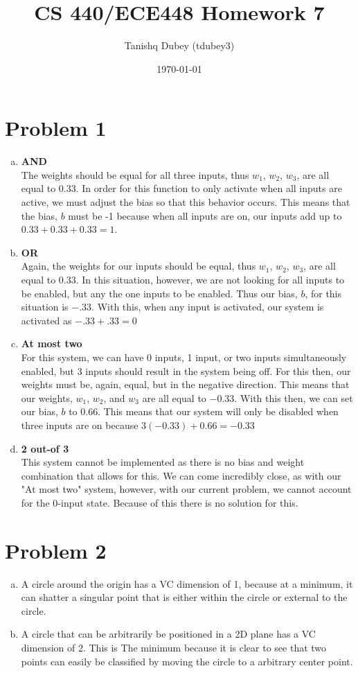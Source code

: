\documentclass[12pt]{article}%
\begin{document}
\title{CS 440/ECE448 Homework 7}
\author{Tanishq Dubey (tdubey3)}
\date{\today}
\maketitle
\section*{Problem 1}
    \begin{enumerate}[a)]
        \item \textbf{AND} \\
        The weights should be equal for all three inputs, thus $w_1$, $w_2$, $w_3$, are all equal to $0.33$. In order for this function to only activate when all inputs are active, we must adjust the bias so that this behavior occurs. This means that the bias, $b$ must be -1 because when all inputs are on, our inputs add up to $0.33 + 0.33 + 0.33 = 1$.
        \item \textbf{OR} \\
        Again, the weights for our inputs should be equal, thus $w_1$, $w_2$, $w_3$, are all equal to $0.33$. In this situation, however, we are not looking for all inputs to be enabled, but any the one inputs to be enabled. Thus our bias, $b$, for this situation is $-.33$. With this, when any input is activated, our system is activated as $-.33 + .33 = 0$
        \item \textbf{At most two} \\
        For this system, we can have 0 inputs, 1 input, or two inputs simultaneously enabled, but 3 inputs should result in the system being off. For this then, our weights must be, again, equal, but in the negative direction. This means that our weights, $w_1$, $w_2$, and $w_3$ are all equal to $-0.33$. With this then, we can set our bias, $b$ to $0.66$. This means that our system will only be disabled when three inputs are on because $3(-0.33) + 0.66 = -0.33$
        \item \textbf{2 out-of 3} \\
        This system cannot be implemented as there is no bias and weight combination that allows for this. We can come incredibly close, as with our "At most two" system, however, with our current problem, we cannot account for the 0-input state. Because of this there is no solution for this.
    \end{enumerate}

\section*{Problem 2}
    \begin{enumerate}[a)]
        \item A circle around the origin has a VC dimension of 1, because at a minimum, it can shatter a singular point that is either within the circle or external to the circle.
        \item A circle that can be arbitrarily be positioned in a 2D plane has a VC dimension of 2. This is The minimum because it is clear to see that two points can easily be classified by moving the circle to a arbitrary center point.
    \end{enumerate}
    
\end{document}
